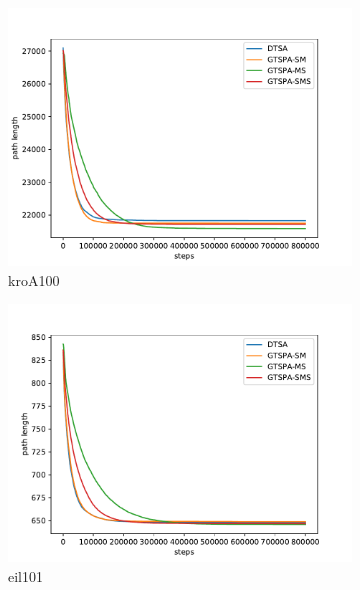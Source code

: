 \documentclass[12pt]{article}
\theoremstyle{plain}
\theoremstyle{definition}
\theoremstyle{remark}
\begin{document}
\begin{figure}[h]
\begin{subfigure}{.5\textwidth}
		\includegraphics[width=\textwidth]{../../Implementation/gen/mean_convergence_kroA100}
		\caption{kroA100}
	\end{subfigure}%
	\begin{subfigure}{.5\textwidth}
		\centering
		\includegraphics[width=\textwidth]{../../Implementation/gen/mean_convergence_eil101}
		\caption{eil101}
	\end{subfigure}
	\begin{subfigure}{.5\textwidth}
		\centering

\end{subfigure}
\end{figure}
\end{document}
